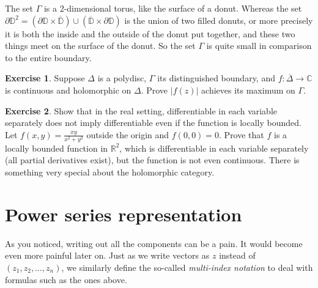 \documentclass[12pt,openany]{book}
\newcommand{\sabs}[1]{\lvert {#1} \rvert}
\newcommand{\C}{{\mathbb{C}}}
\newcommand{\R}{{\mathbb{R}}}
\newcommand{\D}{{\mathbb{D}}}
\newcommand{\myindex}[1]{#1\index{#1}}
\theoremstyle{plain}
\theoremstyle{remark}
\theoremstyle{definition}
\newenvironment{exbox}{%
    \def\FrameCommand{\vrule width 1pt \relax\hspace {10pt}}%
    \MakeFramed {\advance \hsize -\width \FrameRestore }%
}{%
    \endMakeFramed
}
\theoremstyle{exercise}
\newtheorem{exercise}{Exercise}[section]
\theoremstyle{example}
\begin{document}

The set $\Gamma$ is a 2-dimensional torus, like the surface of a
donut.  Whereas the set $\partial \D^2 =
(\partial \D \times \overline{\D}) \cup
(\overline{\D} \times \partial \D)$ is the union of two filled donuts, or more
precisely it is both the inside and the outside of the donut put together,
and these two things meet on the surface of the donut.  So the
set $\Gamma$ is quite small in comparison to the entire boundary.

\begin{exbox}
\begin{exercise}
Suppose $\Delta$ is a polydisc, $\Gamma$ its distinguished boundary,
and $f \colon \overline{\Delta} \to \C$ is continuous and 
holomorphic on $\Delta$.
Prove
$\sabs{f(z)}$ achieves its maximum on $\Gamma$.
\end{exercise}

\begin{exercise}
Show that in the real setting, differentiable
in each variable separately does not imply differentiable even if
the function is locally bounded.
Let $f(x,y) = \frac{xy}{x^2+y^2}$ outside the origin
and $f(0,0) = 0$.  Prove that $f$ is a
locally bounded function in $\R^2$, which is differentiable
in each variable separately (all partial derivatives exist), but 
the function is not even continuous.  There is something very
special about the holomorphic category.
\end{exercise}
\end{exbox}


\section{Power series representation}

As you noticed, writing out all the components can be a pain.  It would become
even more painful later on.  Just as we write 
vectors as $z$ instead of $(z_1,z_2,\ldots,z_n)$, we similarly
define the so-called
\emph{\myindex{multi-index notation}}
to deal with formulas such as the ones above.
\end{document}

